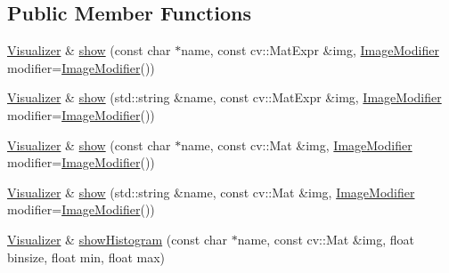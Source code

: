\subsection*{Public Member Functions}
\begin{DoxyCompactItemize}
\item 
\mbox{\hyperlink{classdvo_1_1visualization_1_1_visualizer}{Visualizer}} \& \mbox{\hyperlink{classdvo_1_1visualization_1_1_visualizer_add2fa4993814327d9153aafcda1fea6f}{show}} (const char $\ast$name, const cv\+::\+Mat\+Expr \&img, \mbox{\hyperlink{classdvo_1_1visualization_1_1_visualizer_ac33e0b53e7ef7be64e3230f6c91084a0}{Image\+Modifier}} modifier=\mbox{\hyperlink{classdvo_1_1visualization_1_1_visualizer_ac33e0b53e7ef7be64e3230f6c91084a0}{Image\+Modifier}}())
\item 
\mbox{\hyperlink{classdvo_1_1visualization_1_1_visualizer}{Visualizer}} \& \mbox{\hyperlink{classdvo_1_1visualization_1_1_visualizer_a1dea5a2108f022dfc92ec0eb0aa3a717}{show}} (std\+::string \&name, const cv\+::\+Mat\+Expr \&img, \mbox{\hyperlink{classdvo_1_1visualization_1_1_visualizer_ac33e0b53e7ef7be64e3230f6c91084a0}{Image\+Modifier}} modifier=\mbox{\hyperlink{classdvo_1_1visualization_1_1_visualizer_ac33e0b53e7ef7be64e3230f6c91084a0}{Image\+Modifier}}())
\item 
\mbox{\hyperlink{classdvo_1_1visualization_1_1_visualizer}{Visualizer}} \& \mbox{\hyperlink{classdvo_1_1visualization_1_1_visualizer_a4bf94bdc655c4723e71559de479eae44}{show}} (const char $\ast$name, const cv\+::\+Mat \&img, \mbox{\hyperlink{classdvo_1_1visualization_1_1_visualizer_ac33e0b53e7ef7be64e3230f6c91084a0}{Image\+Modifier}} modifier=\mbox{\hyperlink{classdvo_1_1visualization_1_1_visualizer_ac33e0b53e7ef7be64e3230f6c91084a0}{Image\+Modifier}}())
\item 
\mbox{\hyperlink{classdvo_1_1visualization_1_1_visualizer}{Visualizer}} \& \mbox{\hyperlink{classdvo_1_1visualization_1_1_visualizer_a5d7ddfc5ada5e75da5d9ddb428e17d24}{show}} (std\+::string \&name, const cv\+::\+Mat \&img, \mbox{\hyperlink{classdvo_1_1visualization_1_1_visualizer_ac33e0b53e7ef7be64e3230f6c91084a0}{Image\+Modifier}} modifier=\mbox{\hyperlink{classdvo_1_1visualization_1_1_visualizer_ac33e0b53e7ef7be64e3230f6c91084a0}{Image\+Modifier}}())
\item 
\mbox{\hyperlink{classdvo_1_1visualization_1_1_visualizer}{Visualizer}} \& \mbox{\hyperlink{classdvo_1_1visualization_1_1_visualizer_a11a1116999ef58353e695a62339bb1c4}{show\+Histogram}} (const char $\ast$name, const cv\+::\+Mat \&img, float binsize, float min, float max)

\end{DoxyCompactItemize}
